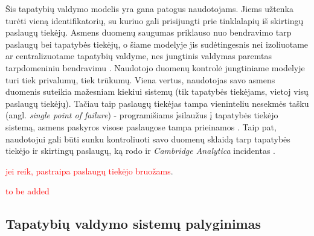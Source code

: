 Šis tapatybių valdymo modelis yra gana patogus naudotojams. Jiems užtenka turėti vieną identifikatorių, su kuriuo
gali prisijungti prie tinklalapių iš skirtingų paslaugų tiekėjų. Asmens duomenų saugumas priklauso nuo
bendravimo tarp paslaugų bei tapatybės tiekėjų, o šiame modelyje jis sudėtingesnis nei izoliuotame ar centralizuotame
tapatybių valdyme, nes jungtinis valdymas paremtas tarpdomeniniu bendravimu \cite{Maler2008}. Naudotojo duomenų kontrolė jungtiniame 
modelyje turi tiek privalumų, tiek trūkumų. Viena vertus, naudotojas savo asmens duomenis suteikia mažesniam kiekiui sistemų (tik tapatybės tiekėjams,
vietoj visų paslaugų tiekėjų). Tačiau taip paslaugų tiekėjas tampa vieninteliu nesekmės tašku (angl. \textit{single point of failure}) - programišiams įsilaužus
į tapatybės tiekėjo sistemą, asmens paskyros visose paslaugose tampa prieinamos \cite{Pashalidis2003}. Taip pat, naudotojui gali būti sunku kontroliuoti
savo duomenų sklaidą tarp tapatybės tiekėjo ir skirtingų paslaugų, ką rodo ir \textit{Cambridge Analytica} incidentas \cite{CambridgeAnalytica}.

\textcolor{red}{jei reik, pastraipa paslaugų tiekėjo bruožams}.


\textcolor{red}{to be added}

\subsection{Tapatybių valdymo sistemų palyginimas}

